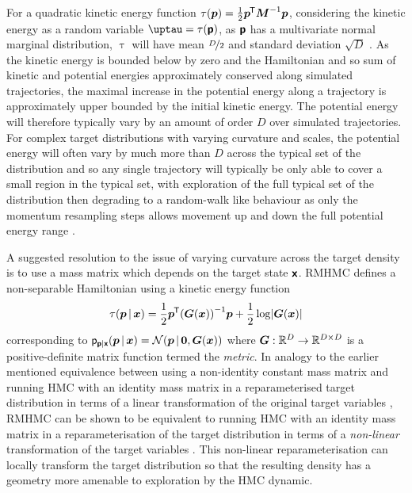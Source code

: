 For a quadratic kinetic energy function $\tau(\boldsymbol{p}) = \frac{1}{2}\boldsymbol{p}^{\mkern-1.5mu\mathsf{T}}\boldsymbol{M}^{-1}\boldsymbol{p}$, considering the kinetic energy as a random variable $\uptau = \tau(\rvct{p})$, as $\boldsymbol{\mathsf{p}}$ has a multivariate normal marginal distribution, $\uptau$ will have mean $\nicefrac{D}{2}$ and standard deviation $\sqrt{D}$ \citep{neal2011mcmc}. As the kinetic energy is bounded below by zero and the Hamiltonian and so sum of kinetic and potential energies approximately conserved along simulated trajectories, the maximal increase in the potential energy along a trajectory is approximately upper bounded by the initial kinetic energy. The potential energy will therefore typically vary by an amount of order $D$ over simulated trajectories. For complex target distributions with varying curvature and scales, the potential energy will often vary by much more than $D$ across the typical set of the distribution and so any single trajectory will typically be only able to cover a small region in the typical set, with exploration of the full typical set of the distribution then degrading to a random-walk like behaviour as only the momentum resampling steps allows movement up and down the full potential energy range \citep{betancourt2013general,betancourt2017conceptual}. %

A suggested resolution to the issue of varying curvature across the target density is to use a mass matrix which depends on the target state $\boldsymbol{\mathsf{x}}$. \acf{RMHMC} \citep{girolami2011riemann} defines a non-separable Hamiltonian using a kinetic energy function
\begin{equation}
  \tau(\vct{p}\gvn\vct{x}) = 
  \frac{1}{2}\vct{p}\tr\lpa\mtx{G}(\vct{x})\rpa^{-1}\vct{p} + \frac{1}{2}\log\left|\mtx{G}(\vct{x})\right|
\end{equation} 
corresponding to $\pden{\rvct{p}|\rvct{x}}(\vct{p}\gvn\vct{x}) = \nrm{\vct{p}\gvn\vct{0}, \mtx{G}(\vct{x})}$ where $\boldsymbol{G} : \mathbb{R}^D \to \mathbb{R}^{D\times D}$ is a positive-definite matrix function termed the \emph{metric}. In analogy to the earlier mentioned equivalence between using a non-identity constant mass matrix and running \ac{HMC} with an identity mass matrix in a reparameterised target distribution in terms of a linear transformation of the original target variables \citep{neal2011mcmc}, \ac{RMHMC} can be shown to be equivalent to running \ac{HMC} with an identity mass matrix in a reparameterisation of the target distribution in terms of a \emph{non-linear} transformation of the target variables \citep{nishimura2016geometrically}. This non-linear reparameterisation can locally transform the target distribution so that the resulting density has a geometry more amenable to exploration by the \ac{HMC} dynamic. 

